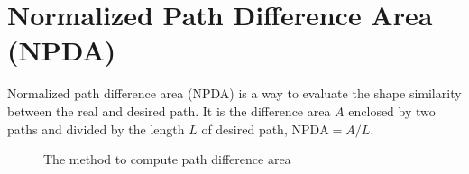 \section{Normalized Path Difference Area (NPDA)}

Normalized path difference area (NPDA)\cite{mao2017segment,su2020survey} 
is a way to evaluate the shape similarity between the real and desired path. 
It is the difference area $A$ enclosed by two paths and 
divided by the length $L$ of desired path, $\text{NPDA} = A/L$.

\begin{figure}[H]
  \begin{minipage}{\textwidth}
    \centering
    \vspace*{-7pt}
    \caption{The method to compute path difference area \label{fig:pda}}
  \end{minipage}  
  \vspace*{-1.5em}
\end{figure}

